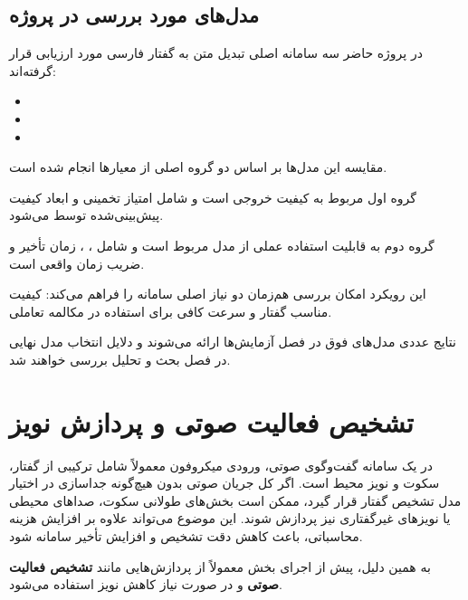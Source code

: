 \subsection{مدل‌های  مورد بررسی در پروژه}

در پروژه حاضر سه سامانه اصلی تبدیل متن به گفتار فارسی مورد
ارزیابی قرار گرفته‌اند:

\begin{itemize}

    \item

    \item

    \item

\end{itemize}

مقایسه این مدل‌ها بر اساس دو گروه اصلی از معیارها انجام شده
است.

گروه اول مربوط به کیفیت خروجی است و شامل امتیاز تخمینی
 و ابعاد کیفیت پیش‌بینی‌شده توسط  می‌شود.

گروه دوم به قابلیت استفاده عملی از مدل مربوط است و شامل
، ، زمان تأخیر و ضریب زمان واقعی است.

این رویکرد امکان بررسی هم‌زمان دو نیاز اصلی سامانه را فراهم
می‌کند:
کیفیت مناسب گفتار و سرعت کافی برای استفاده در مکالمه تعاملی.

نتایج عددی مدل‌های فوق در فصل آزمایش‌ها ارائه می‌شوند و
دلایل انتخاب مدل نهایی در فصل بحث و تحلیل بررسی خواهند شد.

\section{تشخیص فعالیت صوتی و پردازش نویز}

در یک سامانه گفت‌وگوی صوتی، ورودی میکروفون معمولاً شامل
ترکیبی از گفتار، سکوت و نویز محیط است.
اگر کل جریان صوتی بدون هیچ‌گونه جداسازی در اختیار مدل تشخیص
گفتار قرار گیرد، ممکن است بخش‌های طولانی سکوت، صداهای محیطی
یا نویزهای غیرگفتاری نیز پردازش شوند.
این موضوع می‌تواند علاوه بر افزایش هزینه محاسباتی، باعث کاهش
دقت تشخیص و افزایش تأخیر سامانه شود.

به همین دلیل، پیش از اجرای بخش
معمولاً از پردازش‌هایی مانند
\textbf{تشخیص فعالیت صوتی}
و در صورت نیاز کاهش نویز استفاده می‌شود.


